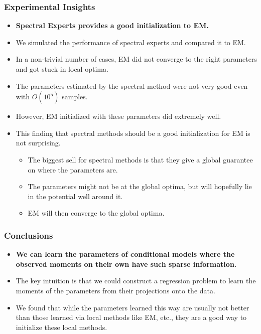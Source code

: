 \documentclass[xcolor={svgnames}]{beamer}
\begin{document}
\begin{frame}
  \frametitle{Experimental Insights}
  \begin{itemize}
    \item {\bf Spectral Experts provides a good initialization to EM.}
      \item We simulated the performance of spectral experts and compared it to EM. 
\item In a non-trivial number of cases, EM did not converge to the right parameters and got stuck in local optima.
\item The parameters estimated by the spectral method were not very good even with $O(10^5)$ samples.
\item However, EM initialized with these parameters did extremely well. 
\item This finding that spectral methods should be a good initialization for EM is not surprising.
  \begin{itemize}
    \item The biggest sell for spectral methods is that they give a global guarantee on where the parameters are.
    \item The parameters might not be at the global optima, but will hopefully lie in the potential well around it.
    \item EM will then converge to the global optima.
  \end{itemize}
  \end{itemize}
\end{frame}

\begin{frame}
  \frametitle{Conclusions}
  \begin{itemize}
    \item {\bf We can learn the parameters of conditional models where the observed moments on their own have such sparse information.}
    \item The key intuition is that we could construct a regression problem to learn the moments of the parameters from their projections onto the data.
    \item We found that while the parameters learned this way are usually not better than those learned via local methods like EM, etc., they are a good way to initialize these local methods.
  \end{itemize}
\end{frame}
\end{document}
